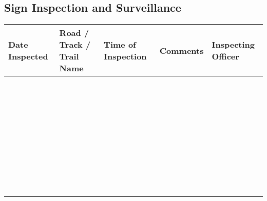 {{{{\begin{landscape}
{{{{{{{\subsection{Sign Inspection and Surveillance}
\begin{longtabu} to \linewidth { | X | X | X | X | X |  }
\hline
{}
\textbf{Date Inspected} & \textbf{Road / Track / Trail Name} & \textbf{Time of Inspection} & \textbf{Comments} & \textbf{Inspecting Officer} \\
\endhead
\hline
& & & & \\
& & & & \\
& & & & \\
\hline
& & & & \\
& & & & \\
& & & & \\
\hline
& & & & \\
& & & & \\
& & & & \\
\hline
& & & & \\
& & & & \\
& & & & \\
\hline
& & & & \\
& & & & \\
& & & & \\
\hline
& & & & \\
& & & & \\
& & & & \\
\hline
& & & & \\
& & & & \\
& & & & \\
\hline
& & & & \\
& & & & \\
& & & & \\
\hline
& & & & \\
& & & & \\
& & & & \\
\hline
& & & & \\
& & & & \\
& & & & \\
\hline
& & & & \\
& & & & \\
& & & & \\
\hline
& & & & \\
& & & & \\
& & & & \\
\hline
& & & & \\
& & & & \\
& & & & \\

\end{longtabu}}}}}}}}
\end{landscape}}}}}

